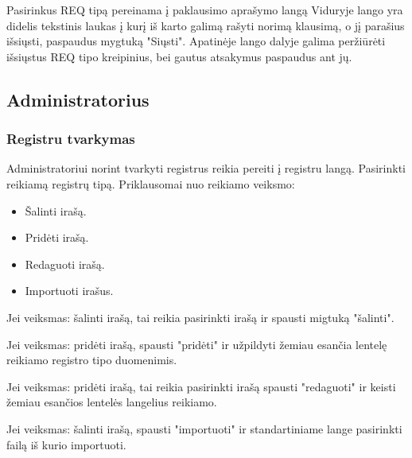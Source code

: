 	
	Pasirinkus REQ tipą pereinama į paklausimo aprašymo langą 
	Viduryje lango yra didelis tekstinis laukas į kurį iš karto galimą rašyti norimą klausimą, o jį parašius išsiųsti, paspaudus mygtuką "Siųsti".
	Apatinėje lango dalyje galima peržiūrėti išsiųstus REQ tipo kreipinius, bei gautus atsakymus paspaudus ant jų.
	

\subsection{Administratorius}

	\subsubsection{Registru tvarkymas}
	
	Administratoriui norint tvarkyti registrus reikia pereiti į registru langą. Pasirinkti reikiamą registrų tipą. 
	Priklausomai nuo reikiamo veiksmo:
	
	\begin{itemize}
		\item Šalinti irašą.
		\item Pridėti irašą.
		\item Redaguoti irašą.
		\item Importuoti irašus.
	\end{itemize}
	
	
	Jei veiksmas: šalinti irašą, tai reikia pasirinkti irašą ir spausti migtuką "šalinti".

	Jei veiksmas: pridėti irašą, spausti "pridėti" ir užpildyti žemiau esančia lentelę reikiamo registro tipo duomenimis.

	Jei veiksmas: pridėti irašą, tai reikia pasirinkti irašą spausti "redaguoti" ir keisti žemiau esančios lentelės langelius reikiamo.
	
	Jei veiksmas: šalinti irašą, spausti "importuoti" ir standartiniame lange pasirinkti failą iš kurio importuoti.